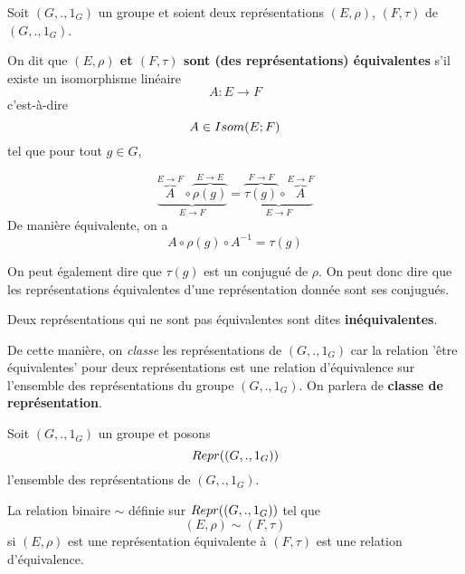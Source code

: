 \begin{definition}
	Soit $(G, ., 1_{G})$ un groupe et soient deux représentations $(E, \rho)$,
	$(F, \tau)$ de $(G, ., 1_{G})$.

	On dit que \textbf{$(E, \rho)$ et $(F, \tau)$ sont (des représentations)
	équivalentes} s'il existe un isomorphisme linéaire
	\begin{equation}
		A : E \rightarrow F
	\end{equation}
	c'est-à-dire
	\begin{equation}
		A \in Isom(E; F)
	\end{equation}
	tel que pour tout $g \in G$,

	\begin{equation}
		\underbrace{\overbrace{A}^{E \rightarrow F} \circ \overbrace{\rho(g)}^{E \rightarrow
		E}}_{E \rightarrow F} = \underbrace{\overbrace{\tau(g)}^{F \rightarrow F} \circ
		\overbrace{A}^{E \rightarrow F}}_{E \rightarrow F}
	\end{equation}
	De manière équivalente, on a
	\begin{equation}
		A \circ \rho(g) \circ A^{-1} = \tau(g)
	\end{equation}

	On peut également dire que $\tau(g)$ est un conjugué de $\rho$.
	On peut donc dire que les représentations équivalentes d'une représentation
	donnée sont ses conjugués.

	Deux représentations qui ne sont pas équivalentes sont dites
	\textbf{inéquivalentes}.
\end{definition}

De cette manière, on \textit{classe} les représentations de $(G, ., 1_{G})$ car la
relation 'être équivalentes' pour deux représentations est une relation
d'équivalence sur l'ensemble des représentations du groupe $(G, ., 1_{G})$. On
parlera de \textbf{classe de représentation}.

\begin{proposition}
	Soit $(G, ., 1_{G})$ un groupe et posons
	\begin{equation}
		Repr((G, ., 1_{G}))
	\end{equation}
	l'ensemble des représentations de $(G, ., 1_{G})$.

	La relation binaire $\sim$ définie sur $Repr((G, ., 1_{G}))$ tel que
	\begin{equation}
		(E, \rho) \sim (F, \tau)
	\end{equation}
	si $(E, \rho)$ est une représentation équivalente à $(F, \tau)$
	est une relation d'équivalence.
\end{proposition}


